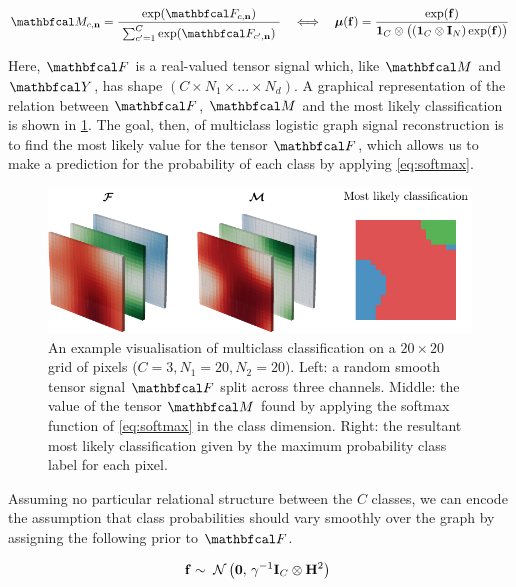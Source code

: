 \begin{equation}
    \label{eq:softmax}
    \Mt_{c, \nn} = \frac{\exp(\Ft_{c, \nn})}{ \raisebox{-0.1cm} { $\sum_{c'=1}^C \exp(\Ft_{c', \nn})$ }}  \quad \Longleftrightarrow \quad \muu(\f) = \frac{\exp(\f)}{\one_C \otimes \big((\one_C \otimes \I_N) \exp(\f)\big)}
\end{equation}

Here, $\Ft$ is a real-valued tensor signal which, like $\Mt$ and $\Yt$, has shape $(C \times N_1 \times ... \times N_d)$. A graphical representation of the relation between $\Ft$, $\Mt$ and the most likely classification is shown in \cref{fig:logistic_gsr_multiclass}. The goal, then, of multiclass logistic graph signal reconstruction is to find the most likely value for the tensor $\Ft$, which allows us to make a prediction for the probability of each class by applying \cref{eq:softmax}.  

\begin{figure}[t]  
    \begin{center}
        \includegraphics[width=\linewidth]{Figures/multiclass.pdf}
    \end{center}
   \caption[Visualisation of multiclass classification on a 2D lattice]{An example visualisation of multiclass classification on a $20 \times 20$ grid of pixels ($C=3, N_1 = 20, N_2 = 20$). Left: a random smooth tensor signal $\Ft$ split across three channels. Middle: the value of the tensor $\Mt$ found by applying the softmax function of \cref{eq:softmax} in the class dimension. Right: the resultant most likely classification given by the maximum probability class label for each pixel. } 
    \label{fig:logistic_gsr_multiclass}
\end{figure} 


Assuming no particular relational structure between the $C$ classes, we can encode the assumption that class probabilities should vary smoothly over the graph by assigning the following prior to $\Ft$. 

\begin{equation}
    \mathbf{f} \sim \; \mathcal{N}\left(\mathbf{0}, \, \gamma^{-1} \mathbf{I}_C \otimes \mathbf{H}^2\right) \;
\end{equation}

